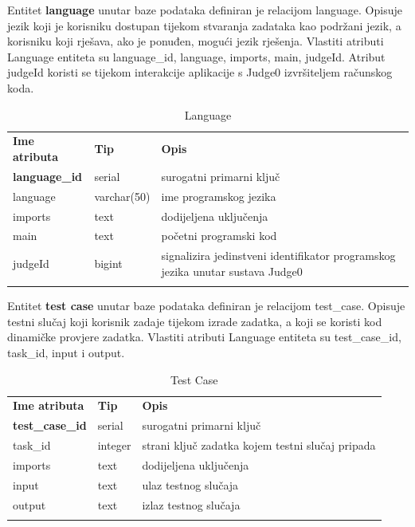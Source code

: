 \documentclass[times, utf8, zavrsni]{fer}
\begin{document}
		Entitet \textbf{language} unutar baze podataka definiran je relacijom language. Opisuje jezik koji je korisniku dostupan tijekom stvaranja zadataka kao podržani jezik, a korisniku koji rješava, ako je ponuđen, mogući jezik rješenja. Vlastiti atributi Language entiteta su language\_id, language, imports, main, judgeId. Atribut judgeId koristi se tijekom interakcije aplikacije s Judge0 izvršiteljem računskog koda. 
		\begin{table}[H]
			\caption{Language}
			\label{tbl:language}
			\centering
			\begin{tabu} to \textwidth {XXX}
				\tabucline[1.75pt]{-}
				\textbf{Ime atributa} & \textbf{Tip} & \textbf{Opis}\\ 				
				\tabucline[1.75pt]{-}
				\textbf{language\_id} & serial & surogatni primarni ključ\\ \hline
				language & varchar(50) & ime programskog jezika\\ \hline
				imports & text & dodijeljena uključenja\\ \hline
				main & text & početni programski kod\\ \hline
				judgeId & bigint & signalizira jedinstveni identifikator programskog jezika unutar sustava Judge0\\ \hline
				\tabucline[1.75pt]{-}
			\end{tabu}
		\end{table}
	
		Entitet \textbf{test case} unutar baze podataka definiran je relacijom test\_case. Opisuje testni slučaj koji korisnik zadaje tijekom izrade zadatka, a koji se koristi kod dinamičke provjere zadatka. Vlastiti atributi Language entiteta su test\_case\_id, task\_id, input i output. 
		\begin{table}[H]
			\caption{Test Case}
			\label{tbl:testcase}
			\centering
			\begin{tabu} to \textwidth {XXX}
				\tabucline[1.75pt]{-}
				\textbf{Ime atributa} & \textbf{Tip} & \textbf{Opis}\\ 				
				\tabucline[1.75pt]{-}
				\textbf{test\_case\_id} & serial & surogatni primarni ključ\\ \hline
				task\_id & integer & strani ključ zadatka kojem testni slučaj pripada\\ \hline
				imports & text & dodijeljena uključenja\\ \hline
				input & text & ulaz testnog slučaja\\ \hline
				output & text & izlaz testnog slučaja\\ \hline
				\tabucline[1.75pt]{-}
			\end{tabu}
		\end{table}
		
\end{document}
